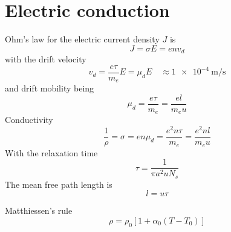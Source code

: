 \section{Electric conduction}

Ohm's law for the electric current density $J$ is
\begin{equation}
    J = \sigma E = e n v_d
\end{equation}
with the drift velocity
\begin{equation}
    v_d = \frac{e \tau}{m_e} E = \mu_d E \quad \approx \SI{1e-4}{\meter\per\second}
\end{equation}
and drift mobility being
\begin{equation}
    \mu_d = \frac{e \tau}{m_e} = \frac{e l}{m_e u}
\end{equation}
Conductivity
\begin{equation}
    \frac{1}{\rho} = \sigma = e n \mu_d = \frac{e^2 n \tau}{m_e} = \frac{e^2 n l}{m_e u}
\end{equation}
With the relaxation time
\begin{equation}
    \tau = \frac{1}{\pi a^2 u N_s}
\end{equation}
The mean free path length is
\begin{equation}
    l = u \tau
\end{equation}

Matthiessen's rule
\begin{equation}
    \rho = \rho_0 \left[ 1 + \alpha_0 \left( T - T_0 \right) \right]
\end{equation}